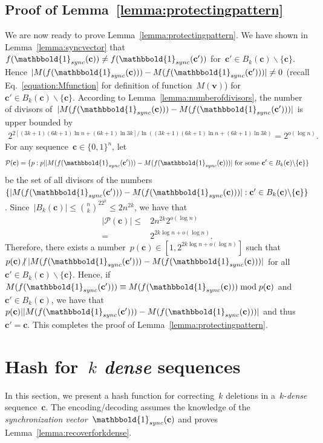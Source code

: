 \documentclass[10pt,a4paper,onecolumn]{IEEEtran}
\newcommand{\1}{\mathbbold{1}}
\newcommand{\boldc}{\mathbf{c}}
\newcommand{\boldv}{\mathbf{v}}
\begin{document}
\subsection{Proof of Lemma~\ref{lemma:protectingpattern}}\label{subsection:proofoflemma2}
We are now ready to prove Lemma~\ref{lemma:protectingpattern}.
We have shown in Lemma~\ref{lemma:syncvector} that~$f(\1_{sync}(\boldc))\ne f(\1_{sync}(\boldc'))$ for~$\boldc'\in B_k(\boldc)\backslash \{\boldc\}$. Hence
\newline$|M(f(\1_{sync}(\boldc)))-M(f(\1_{sync}(\boldc')))|\ne 0$ (recall Eq.~\eqref{equation:Mfunction} for definition of function~$M(\boldv)$) for~$\boldc'\in B_k(\boldc)\backslash \{\boldc\}$.
According to Lemma~\ref{lemma:numberofdivisors}, the number of divisors of~$|M(f(\1_{sync}(\boldc)))-M(f(\1_{sync}(\boldc')))|$ is upper bounded by
\begin{align*}
2^{2[(3k+1)(6k+1)\ln n+(6k+1)\ln 3k]/\ln ((3k+1)(6k+1)\ln n+(6k+1)\ln 3k)}=2^{o(\log n)}. 
\end{align*}
For any sequence~$\boldc\in\{0,1\}^n$, let 
\begin{align*}
    \mathcal{P}(\boldc)=\{p: p| |M(f(\1_{sync}(\boldc')))-M(f(\1_{sync}(\boldc)))| \text{ for some $\boldc'\in B_k(\boldc)\backslash \{\boldc\}$}\} 
\end{align*}
be the set of all divisors of the numbers~$\{|M(f(\1_{sync}(\boldc')))-M(f(\1_{sync}(\boldc)))|: \boldc'\in B_k(\boldc)\backslash \{\boldc\}\}$. Since~$|B_k(\boldc)|\le \binom{n}{k}^22^{k} \le 2n^{2k}$, we have that
\begin{align*}
    |\mathcal{P}(\boldc)|\le& 2n^{2k}2^{o(\log n)}\\=&2^{2k\log n +o(\log n)}.
\end{align*}
Therefore, there exists a number~$p(\boldc)\in [1,2^{2k\log n +o(\log n)}]$
such that~$p(\boldc) \centernot | |M(f(\1_{sync}(\boldc')))-M(f(\1_{sync}(\boldc)))|$ for all~$\boldc'\in B_k(\boldc)\backslash \{\boldc\}$. 
Hence, if~$M(f(\1_{sync}(\boldc')))\equiv M(f(\1_{sync}(\boldc)))\bmod p(\boldc)$ and~$\boldc'\in B_k(\boldc)$, we have that~$p(\boldc)||M(f(\1_{sync}(\boldc')))-M(f(\1_{sync}(\boldc)))|$ and thus~$\boldc'=\boldc$. 
This completes the proof of Lemma~\ref{lemma:protectingpattern}.
\section{Hash for~\emph{$k$ dense} sequences}\label{section:kdensehash}
In this section, we present a hash function for correcting~$k$ deletions in a~$k$-\emph{dense} sequence~$\boldc$. The encoding/decoding assumes the knowledge of the \emph{synchronization vector}~$\1_{sync}(\boldc)$ and proves Lemma~\ref{lemma:recoverforkdense}. 
\end{document}
